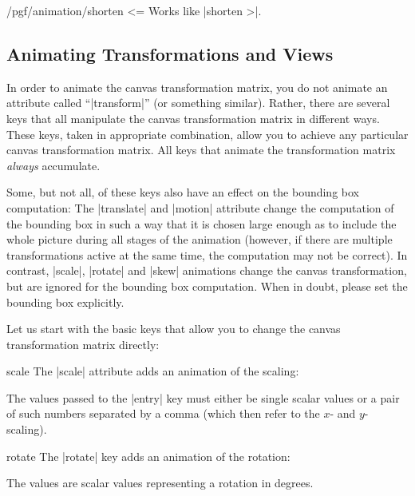 \begin{key}{/pgf/animation/shorten <=}
    Works like |shorten >|.
\end{key}


\subsection{Animating Transformations and Views}
\label{section-base-animation-views}

In order to animate the canvas transformation matrix, you do not animate an
attribute called ``|transform|'' (or something similar). Rather, there are
several keys that all manipulate the canvas transformation matrix in different
ways. These keys, taken in appropriate combination, allow you to achieve any
particular canvas transformation matrix. All keys that animate the
transformation matrix \emph{always} accumulate.

Some, but not all, of these keys also have an effect on the bounding box
computation: The |translate| and |motion| attribute change the computation of
the bounding box in such a way that it is chosen large enough as to include the
whole picture during all stages of the animation (however, if there are
multiple transformations active at the same time, the computation may not be
correct). In contrast, |scale|, |rotate| and |skew| animations change the
canvas transformation, but are ignored for the bounding box computation. When
in doubt, please set the bounding box explicitly.

Let us start with the basic keys that allow you to change the canvas
transformation matrix directly:

\begin{animateattribute}{scale}
    The |scale| attribute adds an animation of the scaling:
\begin{codeexample}[
    preamble={\usepgfmodule{animations}},
    animation list={0.5,1,1.5,2},
]
\end{codeexample}
    The values passed to the |entry| key must either be single scalar values or
    a pair of such numbers separated by a comma (which then refer to the $x$-
    and $y$-scaling).
\end{animateattribute}

\begin{animateattribute}{rotate}
    The |rotate| key adds an animation of the rotation:
\begin{codeexample}[
    preamble={\usepgfmodule{animations}},
    animation list={0.5,1,1.5,2},
]
\end{codeexample}
    The values are scalar values representing a rotation in degrees.
\end{animateattribute}

